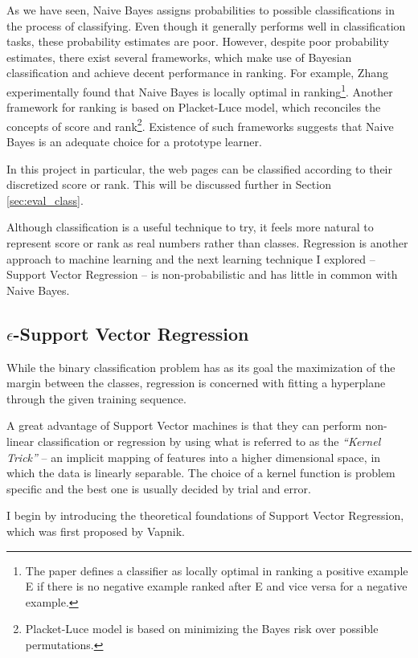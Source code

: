 \documentclass[12pt,a4paper,notitlepage,twoside]{scrbook}
\begin{document}
As we have seen, Naive Bayes assigns probabilities to possible classifications in the
process of classifying. Even though it generally performs well in classification tasks,
these probability estimates are poor\cite{domingos96}.  However, despite poor probability
estimates, there exist several frameworks, which make use of Bayesian classification and
achieve decent performance in ranking. For example, Zhang\cite{zhang04} experimentally
found that Naive Bayes is locally optimal in ranking\footnote{The paper defines a
	classifier as locally optimal in ranking a positive example E if there is no
negative example ranked after E and vice versa for a negative example.}.  Another
framework for ranking\cite{bayesrank} is based on Placket-Luce model, which reconciles the
concepts of score and rank\footnote{Placket-Luce model is based on minimizing the Bayes risk over
possible permutations.}.  Existence of such frameworks suggests that Naive Bayes is an
adequate choice for a prototype learner.

In this project in particular, the web pages can be classified according to their
discretized score or rank. This will be discussed further in Section \ref{sec:eval_class}.

Although classification is a useful technique to try, it feels more natural to
represent score or rank as real numbers rather than classes. Regression is
another approach to machine learning and the next learning technique I explored
-- Support Vector Regression -- is non-probabilistic and has little in common
with Naive Bayes.

\subsection{$\epsilon$-Support Vector Regression}
\label{prep:svm}
While the binary classification problem has as its goal the maximization of the
margin between the classes, regression is concerned with fitting a hyperplane
through the given training sequence. 

A great advantage of Support Vector machines is that they can perform
non-linear classification or regression by using what is referred to as the
\textit{``Kernel Trick''} -- an implicit mapping of features into a higher
dimensional space, in which the data is linearly separable. The choice of a
kernel function is problem specific and the best one is usually decided by
trial and error.

I begin by introducing the theoretical foundations of Support Vector
Regression, which was first proposed by Vapnik\cite{stat_learn}.
\end{document}
